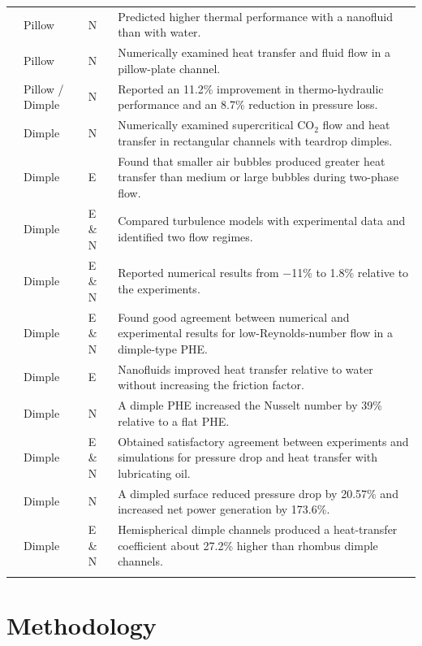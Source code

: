 \documentclass[energies,article,submit,moreauthors,noheaderline]{Definitions/mdpi}
\def\textsuperscript#1{#1}%
\begin{document}
{\begin{longtable}{@{}>{\raggedright}p{2.6cm} >{\raggedright}p{1.6cm} >{\raggedright}p{1.6cm} >{\raggedright\arraybackslash}p{8.9cm}@{}}
\citet{shirzad2019b} & Pillow & N & Predicted higher thermal performance with a nanofluid than with water. \\
\citet{kumar2019} & Pillow & N & Numerically examined heat transfer and fluid flow in a pillow-plate channel. \\
\citet{piper2019} & Pillow / Dimple & N & Reported an 11.2\% improvement in thermo-hydraulic performance and an 8.7\% reduction in pressure loss. \\
\citet{jing2019} & Dimple & N & Numerically examined supercritical CO$_2$ flow and heat transfer in rectangular channels with teardrop dimples. \\
\citet{li2019} & Dimple & E & Found that smaller air bubbles produced greater heat transfer than medium or large bubbles during two-phase flow. \\
\citet{mocnik2020} & Dimple & E \& N & Compared turbulence models with experimental data and identified two flow regimes. \\
\citet{mocnik2023} & Dimple & E \& N & Reported numerical results from $-$11\% to 1.8\% relative to the experiments. \\
\citet{mocnik2024} & Dimple & E \& N & Found good agreement between numerical and experimental results for low-Reynolds-number flow in a dimple-type PHE. \\
\citet{soman2019} & Dimple & E & Nanofluids improved heat transfer relative to water without increasing the friction factor. \\
\citet{soman2022} & Dimple & N & A dimple PHE increased the Nusselt number by 39\% relative to a flat PHE. \\
\citet{torre2019} & Dimple & E \& N & Obtained satisfactory agreement between experiments and simulations for pressure drop and heat transfer with lubricating oil. \\
\citet{wang2019} & Dimple & N & A dimpled surface reduced pressure drop by 20.57\% and increased net power generation by 173.6\%. \\
\citet{ying2021} & Dimple & E \& N & Hemispherical dimple channels produced a heat-transfer coefficient about 27.2\% higher than rhombus dimple channels. \\
\hline
\multicolumn{4}{l}{\textsuperscript{a}E -- Experimental; N -- Numerical}
\end{longtable}
}

\section{Methodology}
\label{sec:methodology}
\end{document}
